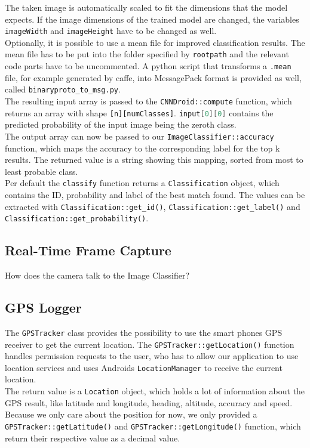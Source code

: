 The taken image is automatically scaled to fit the dimensions that the model expects. If the image dimensions of the trained model are changed, the variables \texttt{imageWidth} and \texttt{imageHeight} have to be changed as well.\\
Optionally, it is possible to use a mean file for improved classification results. The mean file has to be put into the folder specified by \texttt{rootpath} and the relevant code parts have to be uncommented. A python script that transforms a \texttt{.mean} file, for example generated by caffe, into MessagePack format is provided as well, called \texttt{binaryproto_to_msg.py}.\\
The resulting input array is passed to the \texttt{CNNDroid::compute} function, which returns an array with shape \texttt{[n][numClasses]}. \lstinline[language=Java]{input[0][0]} contains the predicted probability of the input image being the zeroth class.\\
The output array can now be passed to our \texttt{ImageClassifier::accuracy} function, which maps the accuracy to the corresponding label for the top k results. The returned value is a string showing this mapping, sorted from most to least probable class.\\
Per default the \texttt{classify} function returns a \texttt{Classification} object, which contains the ID, probability and label of the best match found. The values can be extracted with \texttt{Classification::get_id()}, \texttt{Classification::get_label()} and \texttt{Classification::get_probability()}.

\subsection {Real-Time Frame Capture}
How does the camera talk to the Image Classifier?

\subsection {GPS Logger}
The \texttt{GPSTracker} class provides the possibility to use the smart phones GPS receiver to get the current location. The \texttt{GPSTracker::getLocation()} function handles permission requests to the user, who has to allow our application to use location services and uses Androids \texttt{LocationManager} to receive the current location.\\
The return value is a \texttt{Location} object, which holds a lot of information about the GPS result, like latitude and longitude, heading, altitude, accuracy and speed. Because we only care about the position for now, we only provided a \texttt{GPSTracker::getLatitude()} and \texttt{GPSTracker::getLongitude()} function, which return their respective value as a decimal value.

